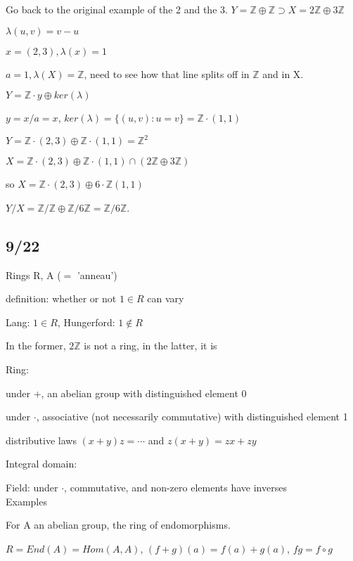 \documentclass[12pt]{article}
\begin{document}
\noindent
Go back to the original example of the 2 and the 3.  $Y = \mathds{Z} \oplus \mathds{Z} \supset X = 2\mathds{Z} \oplus 3\mathds{Z}$

$\lambda(u, v) = v - u$

$x = (2, 3), \lambda(x) = 1$

$a = 1, \lambda(X) = \mathds{Z}$, need to see how that line splits off in $\mathds{Z}$ and in X.

$Y = \mathds{Z}\cdot y \oplus ker(\lambda)$

$y = x/a = x$, $ker(\lambda) = \{(u, v) : u = v\} = \mathds{Z} \cdot (1, 1)$

$Y = \mathds{Z} \cdot (2, 3) \oplus \mathds{Z} \cdot (1, 1) = \mathds{Z}^2$

$X = \mathds{Z} \cdot (2, 3) \oplus \mathds{Z} \cdot (1, 1) \cap (2\mathds{Z} \oplus 3\mathds{Z})$

so $X = \mathds{Z} \cdot (2, 3) \oplus 6 \cdot \mathds{Z}(1, 1)$

$Y/X = \mathds{Z}/\mathds{Z} \oplus \mathds{Z}/6\mathds{Z} = \mathds{Z}/6\mathds{Z}$.

\subsection{9/22}

\noindent
Rings R, A ($=$ 'anneau')

definition: whether or not $1 \in R$ can vary

Lang: $1 \in R$, Hungerford: $1 \not \in R$

In the former, $2\mathds{Z}$ is not a ring, in the latter, it is

\noindent
Ring:

under +, an abelian group with distinguished element 0

under $\cdot$, associative (not necessarily commutative) with distinguished element 1

distributive laws $(x + y)z = \cdots$ and $z(x + y) = zx + zy$

\noindent
Integral domain:

\noindent
Field: under $\cdot$, commutative, and non-zero elements have inverses\\

\noindent
Examples

\noindent
For A an abelian group, the ring of endomorphisms.

$R = End(A) = Hom(A, A)$, $(f + g)(a) = f(a) + g(a)$, $fg = f \circ g$
\end{document}
